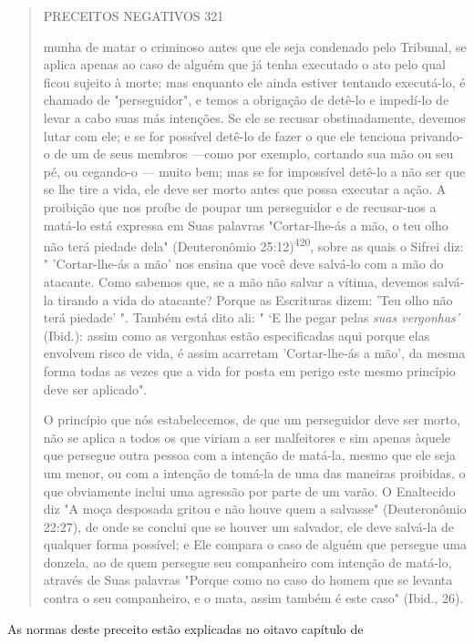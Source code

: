 \begin{quote}
PRECEITOS NEGATIVOS 321

munha de matar o criminoso antes que ele seja condenado pelo Tribunal,
se apli­ca apenas ao caso de alguém que já tenha executado o ato pelo
qual ficou sujeito à morte; mas enquanto ele ainda estiver tentando
executá-lo, é chamado de "per­seguidor", e temos a obrigação de detê-lo
e impedí-lo de levar a cabo suas más intenções. Se ele se recusar
obstinadamente, devemos lutar com ele; e se for pos­sível detê-lo de
fazer o que ele tenciona privando-o de um de seus membros ---como por
exemplo, cortando sua mão ou seu pé, ou cegando-o --- muito bem; mas se
for impossível detê-lo a não ser que se lhe tire a vida, ele deve ser
morto antes que possa executar a ação. A proibição que nos proíbe de
poupar um per­seguidor e de recusar-nos a matá-lo está expressa em Suas
palavras "Cortar-lhe-ás a mão, o teu olho não terá piedade dela"
(Deuteronômio 25:12)\textsuperscript{420}, sobre as quais o Sifrei diz:
" 'Cortar-lhe-ás a mão' nos ensina que você deve salvá-lo com a mão do
atacante. Como sabemos que, se a mão não salvar a vítima, devemos
salvá-la tirando a vida do atacante? Porque as Escrituras dizem: 'Teu
olho não terá piedade' ". Também está dito ali: " `E lhe pegar pelas
\emph{suas vergonhas'} (Ibid.): assim como as vergonhas estão
especificadas aqui porque elas envolvem risco de vida, é assim acarretam
'Cortar-lhe-ás a mão', da mesma forma todas as vezes que a vida for
posta em perigo este mesmo princípio deve ser aplicado".

O princípio que nós estabelecemos, de que um perseguidor deve ser morto,
não se aplica a todos os que viriam a ser malfeitores e sim apenas
àquele que persegue outra pessoa com a intenção de matá-la, mesmo que
ele seja um menor, ou com a intenção de tomá-la de uma das maneiras
proibidas, o que obviamente inclui uma agressão por parte de um varão. O
Enaltecido diz "A moça desposada gritou e não houve quem a salvasse"
(Deuteronômio 22:27), de onde se conclui que se houver um salvador, ele
deve salvá-la de qualquer forma possível; e Ele compara o caso de alguém
que persegue uma donzela, ao de quem persegue seu companheiro com
intenção de matá-lo, através de Suas palavras "Porque como no caso do
homem que se levanta contra o seu companheiro, e o mata, assim também é
este caso" (Ibid., 26).
\end{quote}

As normas deste preceito estão explicadas no oitavo capítulo de

